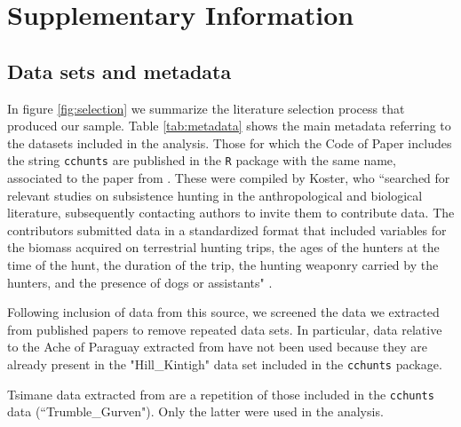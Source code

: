 \setcounter{section}{0}
\section{Supplementary Information}
\subsection{Data sets and metadata}
In figure \ref{fig:selection} we summarize the literature selection process that produced our sample. Table \ref{tab:metadata} shows the main metadata referring to the datasets included in the analysis. Those for which the Code of Paper includes the string \texttt{cchunts} are published in the \texttt{R} package with the same name, associated to the paper from \citet{koster_life_2020}. These were compiled by Koster, who ``searched for relevant studies on subsistence hunting in the anthropological and biological literature, subsequently contacting authors to invite them to contribute data. The contributors submitted data in a standardized format that included variables for the biomass acquired on terrestrial hunting trips, the ages of the hunters at the time of the hunt, the duration of the trip, the hunting weaponry carried by the hunters, and the presence of dogs or assistants" \citep{koster_life_2020}.

Following inclusion of data from this source, we screened the data we extracted from published papers to remove repeated data sets. In particular, data relative to the Ache of Paraguay extracted from \citet{walker_age-dependency_2002} have not been used because they are already present in the "Hill\_Kintigh" data set included in the \texttt{cchunts} package. 

Tsimane data extracted from \citet{gurven_how_2006} are a repetition of those included in the \texttt{cchunts} data (``Trumble\_Gurven"). Only the latter were used in the analysis.


